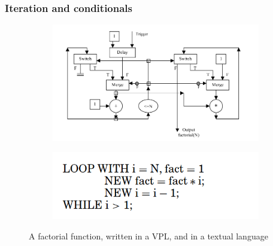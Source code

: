 


\subsubsection*{Iteration and conditionals}

\begin{figure}
  \centering
  \begin{subfigure}[b]{0.45\linewidth}
    \graphicspath{{../../assets/images/background/vpl/}}
    \centering
    \includegraphics[width=\linewidth]{iteration-vpl.png}
    \caption{}\label{fig:vpl-iteration:1}
  \end{subfigure}%
  \qquad %
  \begin{subfigure}[b]{0.45\linewidth}
    \graphicspath{{../../assets/images/background/vpl/}}
    \centering
    \includegraphics[width=\linewidth]{iteration-text.png}
    \caption{}\label{fig:vpl-iteration:2}
  \end{subfigure}%
  \caption[Comparison of iteration]{A factorial function, written in a VPL, and in a textual language \citep{sousa_dataflow_2012}}%
  \label{fig:vpl-iteration}
\end{figure}

